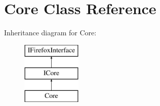 \hypertarget{classefb_1_1Core}{
\section{Core Class Reference}
\label{classefb_1_1Core}
}
Inheritance diagram for Core:\begin{figure}[H]
\begin{center}
\leavevmode
\includegraphics[height=3.000000cm]{classefb_1_1Core}
\end{center}
\end{figure}
